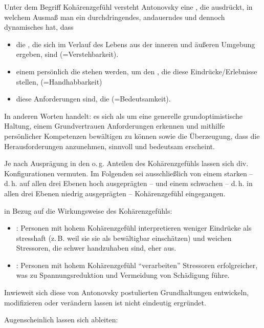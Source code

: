 Unter dem Begriff Kohärenzgefühl versteht Antonovsky eine
, die ausdrückt, in welchem Ausmaß
man ein durchdringendes, andauerndes und dennoch dynamisches
 hat, dass
\begin{itemize}
  \item die , die sich im Verlauf des Lebens aus
  der inneren und äußeren Umgebung ergeben,  sind (=Verstehbarkeit).
  \item einem persönlich die  stehen werden,
  um den , die diese Eindrücke/Erlebnisse stellen,  (=Handhabbarkeit)
  \item diese Anforderungen  sind, die
   (=Bedeutsamkeit).
\end{itemize}
In anderen Worten handelt: es sich als um eine
generelle grundoptimistische Haltung, einem Grundvertrauen Anforderungen erkennen und mithilfe persönlicher Kompetenzen bewältigen zu können sowie die Überzeugung, dass die Herausforderungen anzunehmen, sinnvoll und bedeutsam erscheint. 

Je nach Ausprägung in den o.\,g. Anteilen des
Kohärenzgefühls lassen sich div. Konfigurationen vermuten.
Im Folgenden sei ausschließlich von einem starken -- d.\,h. auf allen drei Ebenen hoch ausgeprägten -- und einem schwachen -- d.\,h. in
allen drei Ebenen niedrig ausgeprägten -- Kohärenzgefühl
eingegangen.

 in Bezug auf die Wirkungsweise des
Kohärenzgefühls:
\begin{itemize}
  \item {}:
  Personen mit hohem Kohärenzgefühl interpretieren weniger
  Eindrücke als stresshaft (z.\,B. weil sie sie als bewältigbar einschätzen) und weichen Stressoren, die schwer
  handzuhaben sind, eher aus.
  \item {}: Personen
  mit hohem Kohärenzgefühl \enquote{verarbeiten} Stressoren erfolgreicher, was zu
  Spannungsreduktion und Vermeidung von Schädigung führe.
\end{itemize}
Inwieweit sich diese von Antonovsky postulierten
Grundhaltungen entwickeln, modifizieren oder verändern
lassen ist nicht eindeutig ergründet.

Augenscheinlich lassen sich  ableiten:

